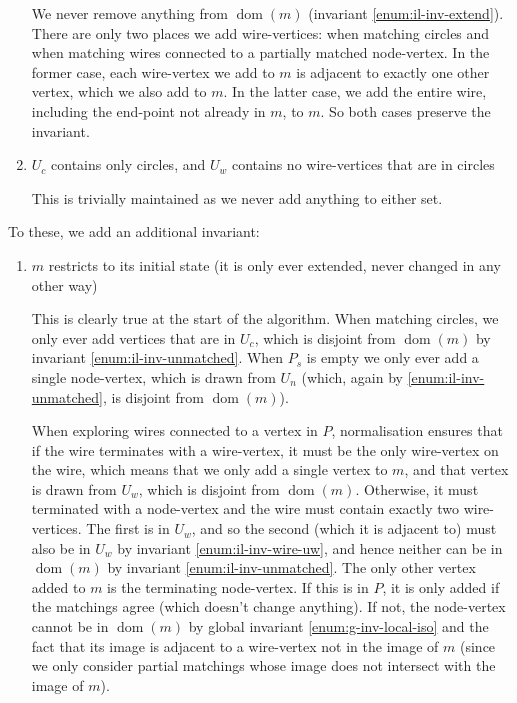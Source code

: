 \documentclass{article}
\DeclareMathOperator{\dom}{dom}
\begin{document}
\begin{enumerate}[label=(\roman*),ref=(\roman*)]
  We never remove anything from $\dom(m)$ (invariant \ref{enum:il-inv-extend}).  There are only two places we add wire-vertices: when matching circles and when matching wires connected to a partially matched node-vertex.  In the former case, each wire-vertex we add to $m$ is adjacent to exactly one other vertex, which we also add to $m$.  In the latter case, we add the entire wire, including the end-point not already in $m$, to $m$.  So both cases preserve the invariant.
  \item $U_c$ contains only circles, and $U_w$ contains no wire-vertices that are in circles

  This is trivially maintained as we never add anything to either set.
\end{enumerate}

To these, we add an additional invariant:
\begin{enumerate}[resume,label=(\roman*),ref=(\roman*)]
  \item \label{enum:il-inv-extend} $m$ restricts to its initial state (it is only ever extended, never changed in any other way)

  This is clearly true at the start of the algorithm.  When matching circles, we only ever add vertices that are in $U_c$, which is disjoint from $\dom(m)$ by invariant \ref{enum:il-inv-unmatched}.  When $P_s$ is empty we only ever add a single node-vertex, which is drawn from $U_n$ (which, again by \ref{enum:il-inv-unmatched}, is disjoint from $\dom(m)$).

  When exploring wires connected to a vertex in $P$, normalisation ensures that if the wire terminates with a wire-vertex, it must be the only wire-vertex on the wire, which means that we only add a single vertex to $m$, and that vertex is drawn from $U_w$, which is disjoint from $\dom(m)$.  Otherwise, it must terminated with a node-vertex and the wire must contain exactly two wire-vertices.  The first is in $U_w$, and so the second (which it is adjacent to) must also be in $U_w$ by invariant \ref{enum:il-inv-wire-uw}, and hence neither can be in $\dom(m)$ by invariant \ref{enum:il-inv-unmatched}.  The only other vertex added to $m$ is the terminating node-vertex.  If this is in $P$, it is only added if the matchings agree (which doesn't change anything).  If not, the node-vertex cannot be in $\dom(m)$ by global invariant \ref{enum:g-inv-local-iso} and the fact that its image is adjacent to a wire-vertex not in the image of $m$ (since we only consider partial matchings whose image does not intersect with the image of $m$).
\end{enumerate}
\end{document}
